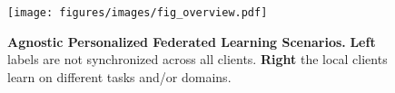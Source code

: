 \begin{figure}
\small
    \centering
    \texttt{[image: figures/images/fig\_overview.pdf]} 
    \vspace{-0.15in}
    \caption{\small{\textbf{Agnostic Personalized Federated Learning Scenarios.}} \textbf{Left} labels are not synchronized across all clients. \textbf{Right} the local clients learn on different tasks and/or domains.}
    \label{fig:overview}
    \vspace{-0.25in}
\end{figure}


